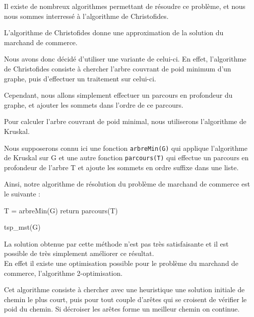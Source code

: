 \documentclass{report}
\begin{document}
  Il existe de nombreux algorithmes permettant de résoudre ce problème, et nous nous sommes interressé à l'algorithme de Christofides.
  
  L'algorithme de Christofides donne une approximation de la solution du marchand de commerce.

  Nous avons donc décidé d'utiliser une variante de celui-ci. En effet, l'algorithme de Christofides consiste à chercher l'arbre couvrant de poid minimum d'un graphe, puis d'effectuer un traitement sur celui-ci.

  Cependant, nous allons simplement effectuer un parcours en profondeur du graphe, et ajouter les sommets dans l'ordre de ce parcours.

  Pour calculer l'arbre couvrant de poid minimal, nous utiliserons l'algorithme de Kruskal.

  Nous supposerons connu ici une fonction \texttt{arbreMin(G)} qui applique l'algorithme de Kruskal sur G et une autre fonction \texttt{parcours(T)} qui effectue un parcours en profondeur de l'arbre T et ajoute les sommets en ordre suffixe dans une liste.

  Ainsi, notre algorithme de résolution du problème de marchand de commerce est le suivante : 

  \begin{algorithm}
    \SetAlgoLined
    T = arbreMin(G)\;
    return parcours(T)\;
    \caption{tsp\_mst(G)}
  \end{algorithm}


  La solution obtenue par cette méthode n'est pas très satisfaisante et il est possible de très simplement améliorer ce résultat. \\ 

  En effet il existe une optimisation possible pour le problème du marchand de commerce, l'algorithme 2-optimisation.

  Cet algorithme consiste à chercher avec une heuristique une solution initiale de chemin le plus court, puis pour tout couple d'arêtes qui se croisent de vérifier le poid du chemin. Si décroiser les arêtes forme un meilleur chemin on continue.
\end{document}
